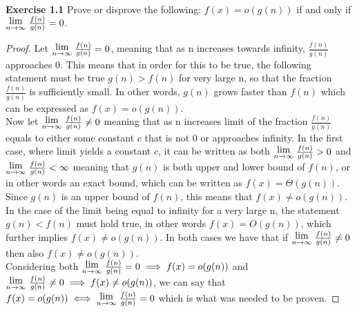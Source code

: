 \documentclass{article}
\newcommand{\Lim}[1]{\raisebox{0.5ex}{{$\displaystyle \lim_{#1}\;$}}}
\newcommand{\subtitle}[1]{%
  \posttitle{%
    \par\end{center}
    \begin{center}\LARGE#1\end{center}
    \vskip0.5em}%
}
\begin{document}
\subtitle{Lecture I}\\
\noindent \textbf{Exercise 1.1} Prove or disprove the following: $f(x) = o(g(n))$ if and only if $\Lim{n \to \infty} \frac{f(n)}{g(n)}=0$.
\begin{proof}
  Let $\Lim{n \to \infty} \frac{f(n)}{g(n)}=0$, meaning that as n increases towards infinity, $\frac{f(n)}{g(n)}$ approaches 0. This means that in order for this to be true, the following statement must be true $g(n) > f(n)$ for very large n, so that the fraction $\frac{f(n)}{g(n)}$ is sufficiently small. In other words, $g(n)$ grows faster than $f(n)$ which can be expressed as $f(x) = o(g(n))$. \\
  
  Now let $\Lim{n \to \infty} \frac{f(n)}{g(n)}\neq0$ meaning that as n increases limit of the fraction $\frac{f(n)}{g(n)}$ equals to either some constant $c$ that is not 0 or approaches infinity. In the first case, where limit yields a constant $c$, it can be written as both $\Lim{n \to \infty} \frac{f(n)}{g(n)}>0$ and $\Lim{n \to \infty} \frac{f(n)}{g(n)}<\infty$ meaning that $g(n)$ is both upper and lower bound of $f(n)$, or in other words an exact bound, which can be written as $f(x) = \Theta(g(n))$. Since $g(n)$ is an upper bound of $f(n)$, this means that $f(x) \neq o(g(n))$. In the case of the limit being equal to infinity for a very large n, the statement $g(n) < f(n)$ must hold true, in other words $f(x) = O(g(n))$, which further implies $f(x) \neq o(g(n))$. In both cases we have that if $\Lim{n \to \infty} \frac{f(n)}{g(n)}\neq0$ then also $f(x) \neq o(g(n))$. \\
  
  Considering both $\Lim{n \to \infty} \frac{f(n)}{g(n)}=0 \implies f(x) = o(g(n))$ and $\Lim{n \to \infty} \frac{f(n)}{g(n)}\neq0 \implies f(x) \neq o(g(n))$, we can say that $f(x) = o(g(n)) \iff \Lim{n \to \infty} \frac{f(n)}{g(n)}=0$ which is what was needed to be proven.

\end{proof}
\end{document}
